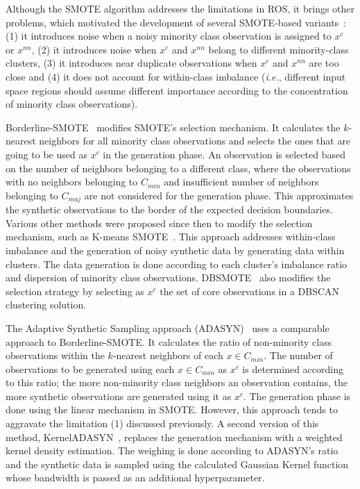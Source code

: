 Although the SMOTE algorithm addresses the limitations in ROS, it brings other
problems, which motivated the development of several SMOTE-based
variants~\cite{Douzas2019}: (1) it introduces noise when a noisy
minority class observation is assigned to $x^c$ or $x^{nn}$, (2) it
introduces noise when $x^c$ and $x^{nn}$ belong to different minority-class
clusters, (3) it introduces near duplicate observations when $x^c$ and
$x^{nn}$ are too close and (4) it does not account for within-class
imbalance (\textit{i.e.}, different input space regions should assume
different importance according to the concentration of minority class
observations).

Borderline-SMOTE~\cite{Han2005} modifies SMOTE's selection
mechanism. It calculates the $k$-nearest neighbors for all minority class
observations and selects the ones that are going to be used as $x^c$ in the
generation phase. An observation is selected based on the number of neighbors
belonging to a different class, where the observations with no neighbors
belonging to $C_{min}$ and insufficient number of neighbors belonging to
$C_{maj}$ are not considered for the generation phase. This approximates the
synthetic observations to the border of the expected decision boundaries.
Various other methods were proposed since then to modify the selection mechanism,
such as K-means SMOTE~\cite{Douzas2018}. This approach addresses
within-class imbalance and the generation of noisy synthetic data by
generating data within clusters. The data generation is done according to each
cluster's imbalance ratio and dispersion of minority class observations.
DBSMOTE~\cite{bunkhumpornpat2012dbsmote} also modifies the selection strategy
by selecting as $x^c$ the set of core observations in a DBSCAN clustering
solution.

The Adaptive Synthetic Sampling approach (ADASYN)~\cite{HaiboHe2008} uses a
comparable approach to Borderline-SMOTE\@. It calculates the ratio of
non-minority class observations within the $k$-nearest neighbors of each $x
\in C_{min}$. The number of observations to be generated using each $x \in
C_{min}$ as $x^c$ is determined according to this ratio; the more non-minority
class neighbors an observation contains, the more synthetic observations are
generated using it as $x^c$. The generation phase is done using the linear
mechanism in SMOTE\@. However, this approach tends to aggravate the limitation
(1) discussed previously. A second version of this method,
KernelADASYN~\cite{tang2015kerneladasyn}, replaces the generation mechanism
with a weighted kernel density estimation. The weighing is done according to
ADASYN's ratio and the synthetic data is sampled using the calculated Gaussian
Kernel function whose bandwidth is passed as an additional hyperparameter.

